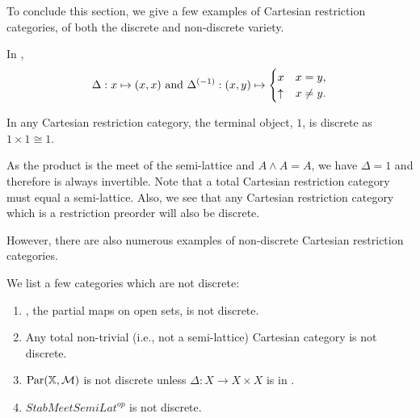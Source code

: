 To conclude this section, we give a few examples of Cartesian restriction categories, of both the
discrete and non-discrete variety.

\begin{example}\label{ex:par_is_discrete}
  In \Par,
  \[
    \Delta: x \mapsto (x,x)\text{ and }{\Delta}^{(-1)}:(x,y)\mapsto\begin{cases}
      x& x = y,\\
      \uparrow & x\ne y.
    \end{cases}
  \]
\end{example}
\begin{example}\label{ex:terminal_object_is_discrete}
  In any Cartesian restriction category, the terminal object, $1$, is discrete as $1\times 1 \cong 1$.
\end{example}
\begin{example}\label{ex:semi-lattice_is_discrete}
  As the product is the meet of the semi-lattice and $A\wedge A = A$, we have $\Delta = 1$ and
  therefore is always invertible. Note that a total Cartesian restriction category must equal a
  semi-lattice. Also, we see that any Cartesian restriction category which is a restriction preorder
  will also be discrete.
\end{example}

However, there are also numerous examples of non-discrete Cartesian restriction categories.
\begin{example}\label{ex:various_not_discrete}
We list a few categories which are not discrete:
  \begin{enumerate}[{(}i{)}]
  \item   \topcatp, the partial maps on open sets, is not discrete.
  \item Any total non-trivial (i.e., not a semi-lattice) Cartesian category is not discrete.
  \item $\text{Par}(\mathbb{X},\mathcal{M})$ is not discrete unless $\Delta: X\to X\times X$ is in \Mstab.
  \item $StabMeetSemiLat^{op}$ is not discrete.
  \end{enumerate}
\end{example}




